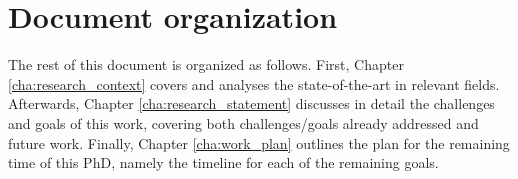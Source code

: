 \section{Document organization}

The rest of this document is organized as follows.
First, Chapter \ref{cha:research_context} covers and analyses the state-of-the-art in relevant fields.
Afterwards, Chapter \ref{cha:research_statement} discusses in detail the challenges and goals of this work, covering both challenges/goals already addressed and future work.
Finally, Chapter \ref{cha:work_plan} outlines the plan for the remaining time of this PhD, namely the timeline for each of the remaining goals.













